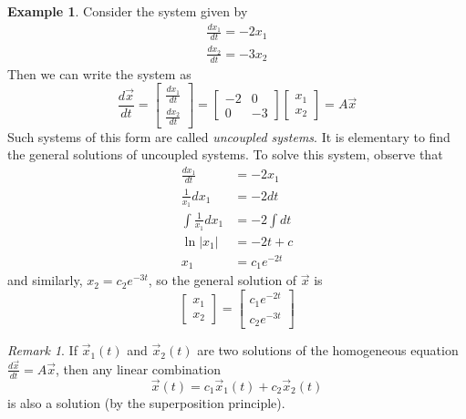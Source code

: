 \documentclass[11pt]{amsart}
\theoremstyle{definition}\newtheorem{definition}{Definition}
\theoremstyle{definition}\newtheorem{notation}{Notation}
\theoremstyle{definition}\newtheorem{example}{Example}
\theoremstyle{theorem}\newtheorem{theorem}{Theorem}
\theoremstyle{theorem}\newtheorem{corollary}{Corollary}
\theoremstyle{theorem}\newtheorem{proposition}{Proposition}
\theoremstyle{theorem}\newtheorem{lemma}{Lemma}
\theoremstyle{theorem}\newtheorem{question}{Question}
\theoremstyle{remark}\newtheorem{remark}{Remark}
\begin{document}
\begin{example}
    Consider the system given by
    \begin{align*}
        \frac{dx_1}{dt} = -2x_1 \\
        \frac{dx_2}{dt} = -3x_2
    \end{align*}
    Then we can write the system as
    \begin{equation*}
        \frac{d\vec{x}}{dt} = \begin{bmatrix} \frac{dx_1}{dt} \\ \frac{dx_2}{dt} \end{bmatrix} = \begin{bmatrix} -2 & 0 \\ 0 & -3 \end{bmatrix} \begin{bmatrix} x_1 \\ x_2 \end{bmatrix} = A\vec{x}
    \end{equation*}
    Such systems of this form are called \emph{uncoupled systems}. It is elementary to find the general solutions of uncoupled systems. To solve this system, observe that
    \begin{align*}
        \frac{dx_1}{dt} &= -2x_1 \\
        \frac{1}{x_1} dx_1 &= -2 dt \\
        \int \frac{1}{x_1} dx_1 &= -2 \int dt \\
        \ln|x_1| &= -2t + c \\
        x_1 &= c_1e^{-2t}
    \end{align*}
    and similarly, $x_2 = c_2e^{-3t}$, so the general solution of $\vec{x}$ is
    \begin{equation*}
        \begin{bmatrix} x_1 \\ x_2 \end{bmatrix} = \begin{bmatrix} c_1e^{-2t} \\ c_2e^{-3t} \end{bmatrix}
    \end{equation*}
\end{example}

\begin{remark}
    If $\vec{x}_1(t)$ and $\vec{x}_2(t)$ are two solutions of the homogeneous equation $\frac{d\vec{x}}{dt} = A\vec{x}$, then any linear combination
    \begin{equation*}
        \vec{x}(t) = c_1\vec{x}_1(t) + c_2\vec{x}_2(t)
    \end{equation*}
    is also a solution (by the superposition principle).
\end{remark}
\end{document}
